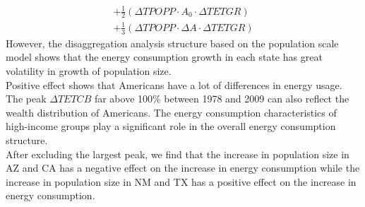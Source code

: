 \begin{itemize}
\begin{multline}
	+\frac{1}{2}\left ( \Delta TPOPP\cdot A_{0}\cdot \Delta TETGR \right ) \\
	+\frac{1}{3}\left ( \Delta TPOPP\cdot \Delta A\cdot \Delta TETGR \right )
	\end{multline}	
	However, the disaggregation analysis structure based on the population scale model shows that the energy consumption growth in each state has great volatility in growth of population size.\\
	Positive effect shows that Americans have a lot of differences in energy usage. The peak $ \Delta TETCB $ far above 100\% between 1978 and 2009 can also reflect the wealth distribution of Americans. The energy consumption characteristics of high-income groups play a significant role in the overall energy consumption structure.\\
	After excluding the largest peak, we find that the increase in population size in AZ and CA has a negative effect on the increase in energy consumption while the increase in population size in NM and TX has a positive effect on the increase in energy consumption.
	\begin{figure}[h]
		\centering                                             %
\end{figure}
\end{itemize}
